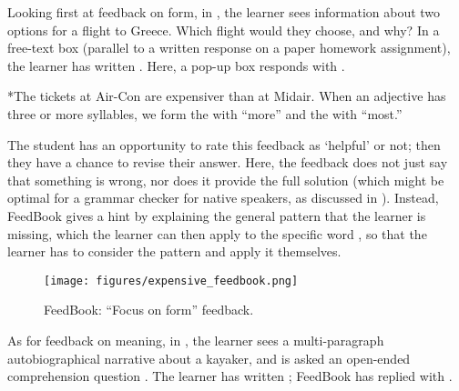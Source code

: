 
Looking first at feedback on form, in , the learner sees information about two options for a flight to Greece.  Which flight would they choose, and why?  In a free-text box (parallel to a written response on a paper homework assignment), the learner has written .  Here, a pop-up box responds with . 

\ea \ea \label{expensiver} *The tickets at Air-Con are expensiver than at Midair.  
\ex \label{corrxn} When an adjective has three or more syllables, we form the  with ``more'' and the  with ``most.''
\z
\z



The student has an opportunity to rate this feedback as  `helpful' or not; then they have a chance to revise their answer.  Here, the feedback does not just say that something is wrong, nor does it provide the full solution (which might be optimal for a grammar checker for native speakers, as discussed in ).  Instead, FeedBook gives a hint by explaining the general pattern that the learner is missing, which the learner can then apply to the specific word , so that the learner  has to consider the pattern and apply it themselves.


\begin{figure}
\texttt{[image: figures/expensive\_feedbook.png]}
\caption{FeedBook: ``Focus on form'' feedback.}
\label{fig:feedbook-focus-on-form}
\end{figure}


As for feedback on meaning, in , the learner sees a multi-paragraph autobiographical narrative about a kayaker, and is asked an open-ended comprehension question .  The learner has written ;  FeedBook has replied with . 

